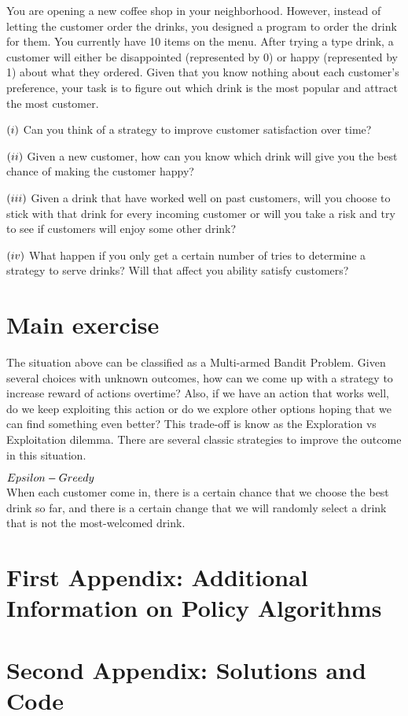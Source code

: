 \documentclass{article}
\begin{document}
You are opening a new coffee shop in your neighborhood. However, instead of letting the customer order the drinks, you designed a program to order the drink for them. You currently have 10 items on the menu. After trying a type drink, a customer will either be disappointed (represented by 0) or happy (represented by 1) about what they ordered. Given that you know nothing about each customer's preference, your task is to figure out which drink is the most popular and attract the most customer.
\begin{addmargin}[2em]{2em}

$\newline\newline(i)$
Can you think of a strategy to improve customer satisfaction over time? 

$\newline (ii)$
Given a new customer, how can you know which drink will give you the best chance of making the customer happy?

$\newline (iii)$
Given a drink that have worked well on past customers, will you choose to stick with that drink for every incoming customer or will you take a risk and try to see if customers will enjoy some other drink?

$\newline (iv)$
What happen if you only get a certain number of tries to determine a strategy to serve drinks? Will that affect you ability satisfy customers?

\end{addmargin}

\section{Main exercise}
The situation above can be classified as a Multi-armed Bandit Problem. Given several choices with unknown outcomes, how can we come up with a strategy to increase reward of actions overtime? Also, if we have an action that works well, do we keep exploiting this action or do we explore other options hoping that we can find something even better? This trade-off is know as the Exploration vs Exploitation dilemma. There are several classic strategies to improve the outcome in this situation.
\begin{addmargin}[2em]{2em}
$\newline Epsilon-Greedy$ \\
When each customer come in, there is a certain chance that we choose the best drink so far, and there is a certain change that we will randomly select a drink that is not the most-welcomed drink. 
\end{addmargin}
\section{First Appendix: Additional Information on Policy Algorithms}
\section{Second Appendix: Solutions and Code}




\end{document}
